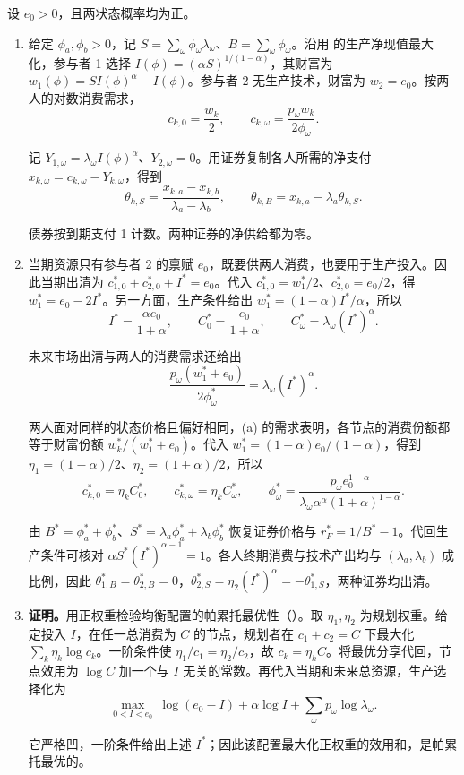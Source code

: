\begin{solution}[blank-type=manual,blank-vsep=9\baselineskip]

设 $e_0>0$，且两状态概率均为正。
\begin{enumerate}[label=(\alph*)]
\item 给定 $\phi_a,\phi_b>0$，记 $S=\sum_\omega\phi_\omega\lambda_\omega$、$B=\sum_\omega\phi_\omega$。沿用 的生产净现值最大化，参与者 1 选择 $I(\phi)=(\alpha S)^{1/(1-\alpha)}$，其财富为 $w_1(\phi)=SI(\phi)^\alpha-I(\phi)$。参与者 2 无生产技术，财富为 $w_2=e_0$。按两人的对数消费需求，
\[
 c_{k,0}=\frac{w_k}{2},\qquad c_{k,\omega}=\frac{p_\omega w_k}{2\phi_\omega}.
\]

记 $Y_{1,\omega}=\lambda_\omega I(\phi)^\alpha$、$Y_{2,\omega}=0$。用证券复制各人所需的净支付 $x_{k,\omega}=c_{k,\omega}-Y_{k,\omega}$，得到
\[
 \theta_{k,S}=\frac{x_{k,a}-x_{k,b}}{\lambda_a-\lambda_b},\qquad
 \theta_{k,B}=x_{k,a}-\lambda_a\theta_{k,S}.
\]

债券按到期支付 1 计数。两种证券的净供给都为零。
\item 当期资源只有参与者 2 的禀赋 $e_0$，既要供两人消费，也要用于生产投入。因此当期出清为 $c_{1,0}^*+c_{2,0}^*+I^*=e_0$。代入 $c_{1,0}^*=w_1^*/2$、$c_{2,0}^*=e_0/2$，得 $w_1^*=e_0-2I^*$。另一方面，生产条件给出 $w_1^*=(1-\alpha)I^*/\alpha$，所以
\[
 I^*=\frac{\alpha e_0}{1+\alpha},\qquad
 C_0^*=\frac{e_0}{1+\alpha},\qquad
 C_\omega^*=\lambda_\omega(I^*)^\alpha.
\]

未来市场出清与两人的消费需求还给出
\[
 \frac{p_\omega(w_1^*+e_0)}{2\phi_\omega^*}=\lambda_\omega(I^*)^\alpha.
\]

两人面对同样的状态价格且偏好相同，(a) 的需求表明，各节点的消费份额都等于财富份额 $w_k^*/(w_1^*+e_0)$。代入 $w_1^*=(1-\alpha)e_0/(1+\alpha)$，得到 $\eta_1=(1-\alpha)/2$、$\eta_2=(1+\alpha)/2$，所以
\[
 c_{k,0}^*=\eta_kC_0^*,\qquad c_{k,\omega}^*=\eta_kC_\omega^*,
 \qquad
 \boxed{\phi_\omega^*=\frac{p_\omega e_0^{1-\alpha}}
 {\lambda_\omega\alpha^\alpha(1+\alpha)^{1-\alpha}}}.
\]

由 $B^*=\phi_a^*+\phi_b^*$、$S^*=\lambda_a\phi_a^*+\lambda_b\phi_b^*$ 恢复证券价格与 $r_F^*=1/B^*-1$。代回生产条件可核对 $\alpha S^*(I^*)^{\alpha-1}=1$。各人终期消费与技术产出均与 $(\lambda_a,\lambda_b)$ 成比例，因此 $\theta_{1,B}^*=\theta_{2,B}^*=0$，$\theta_{2,S}^*=\eta_2(I^*)^\alpha=-\theta_{1,S}^*$，两种证券均出清。
\item \textbf{证明。}用正权重检验均衡配置的帕累托最优性\ifdefined\WJHandoutKnowledge（）\fi。取 $\eta_1,\eta_2$ 为规划权重。给定投入 $I$，在任一总消费为 $C$ 的节点，规划者在 $c_1+c_2=C$ 下最大化 $\sum_k\eta_k\log c_k$。一阶条件使 $\eta_1/c_1=\eta_2/c_2$，故 $c_k=\eta_k C$。将最优分享代回，节点效用为 $\log C$ 加一个与 $I$ 无关的常数。再代入当期和未来总资源，生产选择化为
\[
 \max_{0<I<e_0}\ \log(e_0-I)+\alpha\log I+\sum_\omega p_\omega\log\lambda_\omega.
\]

它严格凹，一阶条件给出上述 $I^*$；因此该配置最大化正权重的效用和，是帕累托最优的。\qedhere
\end{enumerate}
\end{solution}

